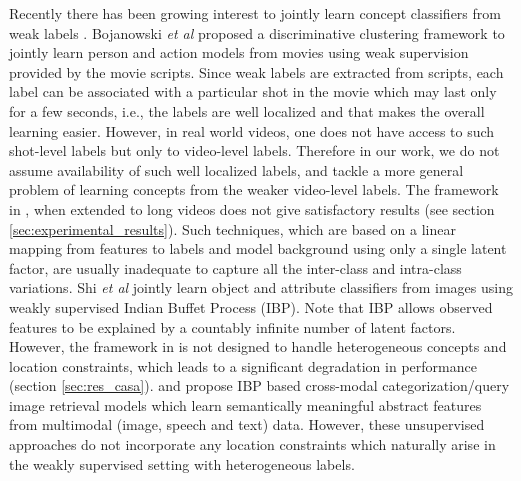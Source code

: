 \documentclass[runningheads]{llncs}
\begin{document}
Recently there has been growing interest to jointly learn concept classifiers from weak labels \cite{shi2014weakly,bojanowski2013finding}.  Bojanowski {\it et al} \cite{bojanowski2013finding} proposed a discriminative clustering framework to jointly learn person and action models from movies using weak supervision provided by the movie scripts. Since weak labels are extracted from scripts, each label can be associated with a particular shot in the movie which may last only for a few seconds, i.e., the labels are well localized and that makes the overall learning easier. 
However, in real world videos, one does not have access to such shot-level labels but only to video-level labels. Therefore in our work, we do not assume availability of such well localized labels, and tackle a  more general problem of learning concepts from the weaker video-level labels. The framework in \cite{bojanowski2013finding}, when extended to long videos does not give satisfactory results (see section \ref{sec:experimental_results}). Such techniques, which are based on a linear mapping from features to labels and model background using only a single latent factor, are usually inadequate to capture all the inter-class and intra-class variations.
Shi {\it et al} \cite{shi2014weakly} jointly learn object and attribute classifiers from images using weakly supervised Indian Buffet Process (IBP). Note that IBP \cite{ghahramani2005infinite,griffiths2011indian} 
allows observed features to be explained by a countably infinite number of latent factors. However, the framework in \cite{shi2014weakly} is not designed to handle heterogeneous concepts and location constraints, which leads to a significant degradation in performance (section \ref{sec:res_casa}). \cite{ozdemir2014probabilistic} and \cite{yildirim2012rational} propose IBP based cross-modal categorization/query image retrieval models which learn semantically meaningful abstract features from multimodal (image, speech and text) data. However, these unsupervised approaches do not incorporate any location constraints which naturally arise in the weakly supervised setting with heterogeneous labels.
\end{document}
